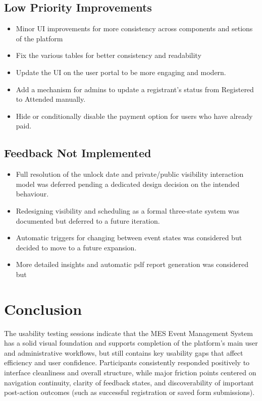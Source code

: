 \documentclass[12pt]{article}
\begin{document}
\subsection{Low Priority Improvements}
\begin{itemize}
    \item Minor UI improvements for more consistency across components and setions of the platform
    \item Fix the various tables for better consistency and readability
    \item Update the UI on the user portal to be more engaging and modern.
    \item Add a mechanism for admins to update a registrant's status from Registered to Attended manually.
    \item Hide or conditionally disable the payment option for users who have already paid.
\end{itemize}
\subsection{Feedback Not Implemented}
\begin{itemize}
    \item Full resolution of the unlock date and private/public visibility interaction model was deferred pending a dedicated design decision on the intended behaviour.
    \item Redesigning visibility and scheduling as a formal three-state system was documented but deferred to a future iteration.
    \item Automatic triggers for changing between event states was considered but decided to move to a future expansion. 
    \item More detailed insights and automatic pdf report generation was considered but 
\end{itemize}

\section{Conclusion}
The usability testing sessions indicate that the MES Event Management System has a solid visual foundation and supports completion of the platform's main user and administrative workflows, but still contains key usability gaps that affect efficiency and user confidence. Participants consistently responded positively to interface cleanliness and overall structure, while major friction points centered on navigation continuity, clarity of feedback states, and discoverability of important post-action outcomes (such as successful registration or saved form submissions).
\end{document}
